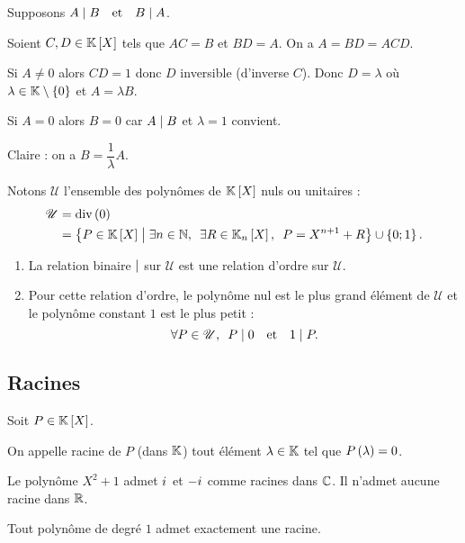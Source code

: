 \begin{dem}
\impdir

Supposons \(A\mid B\quad\text{et}\quad B\mid A\).

Soient \(C,D\in\poly\) tels que \(AC=B\) et \(BD=A\). On a \(A=BD=ACD\).

Si \(A\not=0\) alors \(CD=1\) donc \(D\) inversible (d'inverse \(C\)). Donc \(D=\lambda\) où \(\lambda\in\mathbb{K}\setminus\left\lbrace0\right\rbrace\) et \(A=\lambda B\).

Si \(A=0\) alors \(B=0\) car \(A\mid B\) et \(\lambda=1\) convient.

\imprec

Claire : on a \(B=\dfrac{1}{\lambda}A\).
\end{dem}

\begin{prop}
\renewcommand{\U}{\mathscr{U}}
Notons \(\U\) l'ensemble des polynômes de \(\poly\) nuls ou unitaires : \[\begin{aligned}
\U&=\ensdiv0 \\
&=\accol{P\in\poly\tq\quantifs{\exists n\in\N;\exists R\in\poly[\K_n]}P=X^{n+1}+R}\union\accol{0;1}.
\end{aligned}\]

\begin{enumerate}
\item La relation binaire \(\mid\) sur \(\U\) est une relation d'ordre sur \(\U\). \\

\item Pour cette relation d'ordre, le polynôme nul est le plus grand élément de \(\U\) et le polynôme constant \(1\) est le plus petit : \[\quantifs{\forall P\in\U}P\divise0\quad\text{et}\quad1\divise P.\]
\end{enumerate}
\end{prop}

\subsection{Racines}

\begin{defi}[Racine]
Soit \(P\in\poly\).

On appelle racine de \(P\) (dans \(\mathbb{K}\)) tout élément \(\lambda\in\mathbb{K}\) tel que \(P\left(\lambda\right)=0\).
\end{defi}

\begin{ex}
Le polynôme \(X^2+1\) admet \(i\mkern1mu\) et \(-i\mkern1mu\) comme racines dans \(\mathbb{C}\). Il n'admet aucune racine dans \(\mathbb{R}\).

Tout polynôme de degré \(1\) admet exactement une racine.
\end{ex}

